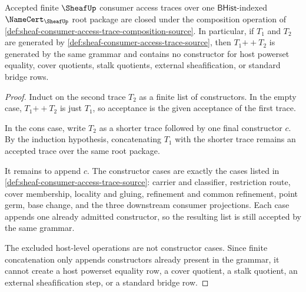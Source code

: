 \begin{theorem}
\label{thm:sheaf-consumer-access-trace-concat-closure}
Accepted finite $\SheafUp$ consumer access traces over one $\mathsf{BHist}$-indexed $\NameCert_{\SheafUp}$ root package are closed under the composition operation of \autoref{def:sheaf-consumer-access-trace-composition-source}. In particular, if $T_1$ and $T_2$ are generated by \autoref{def:sheaf-consumer-access-trace-source}, then $T_1 \mathbin{+\!\!+} T_2$ is generated by the same grammar and contains no constructor for host powerset equality, cover quotients, stalk quotients, external sheafification, or standard bridge rows.
\end{theorem}
\begin{proof}
Induct on the second trace $T_2$ as a finite list of constructors. In the empty case, $T_1 \mathbin{+\!\!+} T_2$ is just $T_1$, so acceptance is the given acceptance of the first trace.

In the cons case, write $T_2$ as a shorter trace followed by one final constructor $c$. By the induction hypothesis, concatenating $T_1$ with the shorter trace remains an accepted trace over the same root package.

It remains to append $c$. The constructor cases are exactly the cases listed in \autoref{def:sheaf-consumer-access-trace-source}: carrier and classifier, restriction route, cover membership, locality and gluing, refinement and common refinement, point germ, base change, and the three downstream consumer projections. Each case appends one already admitted constructor, so the resulting list is still accepted by the same grammar.

The excluded host-level operations are not constructor cases. Since finite concatenation only appends constructors already present in the grammar, it cannot create a host powerset equality row, a cover quotient, a stalk quotient, an external sheafification step, or a standard bridge row.
\end{proof}

